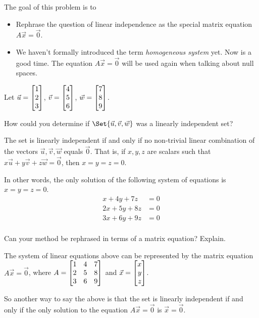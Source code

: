 	\bookonlynewpage
	\question
	\begin{annotation}
		\begin{goals}

			The goal of this problem is to
			\begin{itemize}
				\item Rephrase the question of linear independence as the special
					matrix equation $A\vec x=\vec 0$.
			\end{itemize}
		\end{goals}

		\begin{notes}
			\begin{itemize}
				\item We haven't formally introduced the term \emph{homogeneous system}
					yet. Now is a good time. The equation $A\vec x=\vec 0$ will be used
					again when talking about null spaces.
			\end{itemize}
		\end{notes}
	\end{annotation}
	Let $\vec u=\mat{1\\2\\3}$, $\vec v=\mat{4\\5\\6}$, $\vec w=\mat{7\\8\\9}$.
	\begin{parts}
		\item How could you determine if $\Set{\vec u,\vec v,\vec w}$ was a linearly
			independent set?
			\begin{solution}
				The set is linearly independent if and only if no non-trivial linear
				combination of the vectors $\vec u,\vec v,\vec w$ equals $\vec 0$.
				That is, if $x, y, z$ are scalars such that
				$x\vec u+y\vec v+z\vec w=\vec 0$, then $x=y=z=0$.

				In other words, the only solution of the following
				system of equations is $x=y=z=0$.
				\begin{align*}
					x + 4y + 7z &= 0 \\
					2x + 5y + 8z &= 0 \\
					3x + 6y + 9z &= 0 \\
				\end{align*}
			\end{solution}
		\item Can your method be rephrased in terms of a matrix equation? Explain.
			\begin{solution}
				The system of linear equations above can be represented by the
				matrix equation $A\vec x = \vec 0$, where $A = \mat{1&4&7\\2&5&8\\3&6&9}$
				and $\vec x=\mat{x\\y\\z}$.

				So another way to say the above is that the set is linearly independent
				if and only if the only solution to the equation $A \vec x = \vec 0$
				is $\vec x = \vec 0$.
			\end{solution}
	\end{parts}


